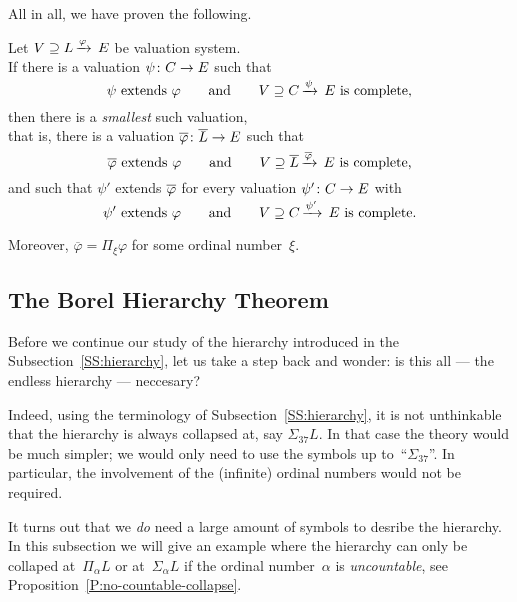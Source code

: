 All in all, we have proven the following.
\begin{prop}
\label{P:smallest-complete-extension}
Let $V \supseteq L\,\smash{\xrightarrow{\varphi}\,E}$ 
be valuation system.\\
If there is a valuation $\psi\colon C\rightarrow E$ such that
\begin{equation*}
\text{$\psi$ extends~$\varphi$}
\qquad\text{and}\qquad
\text{$V \supseteq C\,\smash{\xrightarrow{\psi}\,E}$ is complete,}
\end{equation*}
then there is a \emph{smallest} such valuation,\\
that is, 
there is a valuation $\overline\varphi\colon \overline{L}\rightarrow E$
such that
\begin{equation*}
\text{$\overline{\varphi}$ extends~$\varphi$}
\qquad\text{and}\qquad
\text{$V \supseteq \overline{L}\,\smash{\xrightarrow{\overline{\varphi}}\,E}$ is complete,}
\end{equation*}
and such that 
$\psi'$ extends $\overline{\varphi}$
 for every valuation $\psi'\colon C\rightarrow E$ with
\begin{equation*}
\text{$\psi'$ extends~$\varphi$}
\qquad\text{and}\qquad
\text{$V \supseteq C\,\smash{\xrightarrow{\psi'}\,E}$ is complete.}
\end{equation*}

Moreover,
$\overline{\varphi} = \Pi_\xi \varphi$
for some ordinal number~$\xi$.
\end{prop}

\clearpage
%
%
\subsection{The Borel Hierarchy Theorem}$\,$\\
\label{SS:borel-hierarchy}%
Before we continue our study of the hierarchy introduced in the
Subsection~\ref{SS:hierarchy}, let us take a step back and wonder: 
 is this all --- the endless hierarchy --- neccesary?

Indeed,
using the terminology of Subsection~\ref{SS:hierarchy},
it is not unthinkable
that the hierarchy is always collapsed
at, say $\Sigma_{37} L$.
In that case 
the theory would be much simpler;
we would only need to
use the symbols up to~``$\Sigma_{37}$''.
In particular,
the involvement of the (infinite) ordinal numbers would not be required.

It turns out that we \emph{do} need a large amount of symbols
to desribe the hierarchy.
In this subsection we will give an example
where the hierarchy can only be collaped at~$\Pi_\alpha L$
or at~$\Sigma_\alpha L$
if the ordinal number~$\alpha$ is \emph{uncountable},
see Proposition~\ref{P:no-countable-collapse}.


